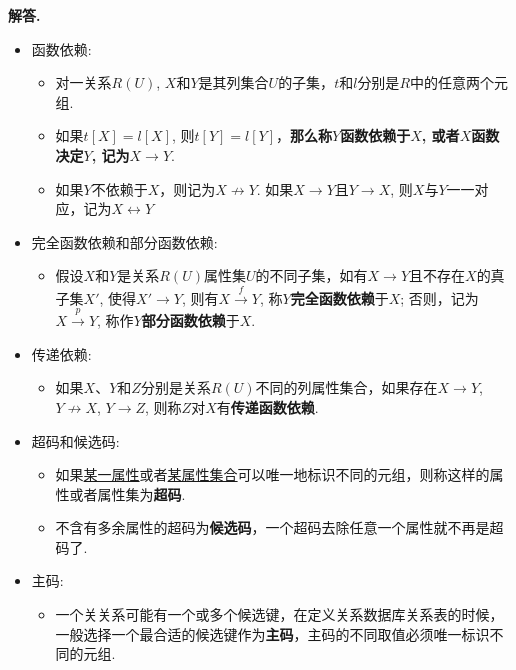 \documentclass[12pt, oneside]{ctexart}
\numberwithin{figure}{section}
\numberwithin{table}{section}
\def\red{\color{red}}
\newenvironment{solution}{\par\noindent\textbf{解答. }}{\par}
\begin{document}
\begin{solution}
    \begin{itemize}
        \item 函数依赖: 
            \begin{itemize}
                \item 对一关系$R(U)$, $X$和$Y$是其列集合$U$的子集，$t$和$l$分别是$R$中的任意两个元组.
                \item 如果$t[X] = l[X]$, 则$t[Y] = l[Y]$，\textbf{\red 那么称$Y$函数依赖于$X$, 或者$X$函数决定$Y$, 记为$X \rightarrow Y$}.
                \item 如果$Y$不依赖于$X$，则记为$X \not\rightarrow Y$. 如果$X \rightarrow Y$且$Y \rightarrow X$, 则$X$与$Y$一一对应，记为$X \leftrightarrow Y$
            \end{itemize}
        \item 完全函数依赖和部分函数依赖: 
            \begin{itemize}
                \item 假设$X$和$Y$是关系$R(U)$属性集$U$的不同子集，如有$X \rightarrow Y$且不存在$X$的真子集$X'$, 使得$X' \rightarrow Y$, 则有$X \xrightarrow{f} Y$, 称$Y$\textbf{\red 完全函数依赖}于$X$; 否则，记为$X \xrightarrow{p} Y$, 称作$Y$\textbf{\red 部分函数依赖}于$X$.
            \end{itemize}
        \item 传递依赖: 
            \begin{itemize}
                \item 如果$X$、$Y$和$Z$分别是关系$R(U)$不同的列属性集合，如果存在$X \rightarrow Y$, $Y \not\rightarrow X$, $Y \rightarrow Z$, 则称$Z$对$X$有\textbf{\red 传递函数依赖}.
            \end{itemize}
        \item 超码和候选码:
            \begin{itemize}
                \item 如果\uline{某一属性}或者\uline{某属性集合}可以唯一地标识不同的元组，则称这样的属性或者属性集为\textbf{\red 超码}.
                \item 不含有多余属性的超码为\textbf{\red 候选码}，一个超码去除任意一个属性就不再是超码了.
            \end{itemize}
        \item 主码: 
            \begin{itemize}
                \item 一个关关系可能有一个或多个候选键，在定义关系数据库关系表的时候，一般选择一个最合适的候选键作为\textbf{\red 主码}，主码的不同取值必须唯一标识不同的元组.

\end{itemize}
\end{itemize}
\end{solution}
\end{document}
